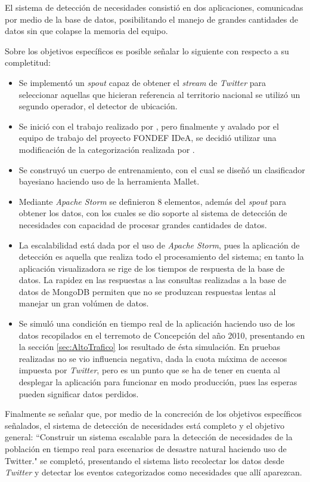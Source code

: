 El sistema de detección de necesidades consistió en dos aplicaciones, comunicadas por medio de la base de datos, posibilitando el manejo de grandes cantidades de datos sin que colapse la memoria del equipo.

Sobre los objetivos específicos es posible señalar lo siguiente con respecto a su completitud:

\begin{itemize}
\item Se implementó un \textit{spout} capaz de obtener el \textit{stream} de \textit{Twitter} para seleccionar aquellas que hicieran referencia al territorio nacional se utilizó un segundo operador, el detector de ubicación.
\item Se inició con el trabajo realizado por \cite{TaxonomiaChato}, pero finalmente y avalado por el equipo de trabajo del proyecto FONDEF IDeA, se decidió utilizar una modificación de la categorización realizada por \cite{PMIProfes}.
\item Se construyó un cuerpo de entrenamiento, con el cual se diseñó un clasificador bayesiano haciendo uso de la herramienta Mallet.
\item Mediante \textit{Apache Storm} se definieron 8 elementos, además del \textit{spout} para obtener los datos, con los cuales se dio soporte al sistema de detección de necesidades con capacidad de procesar grandes cantidades de datos.
\item La escalabilidad está dada por el uso de \textit{Apache Storm}, pues la aplicación de detección es aquella que realiza todo el procesamiento del sistema; en tanto la aplicación visualizadora se rige de los tiempos de respuesta de la base de datos. La rapidez en las respuestas a las consultas realizadas a la base de datos de MongoDB permiten que no se produzcan respuestas lentas al manejar un gran volúmen de datos.
\item Se simuló una condición en tiempo real de la aplicación haciendo uso de los datos recopilados en el terremoto de Concepción del año 2010, presentando en la sección \ref{sec:AltoTrafico} los resultado de ésta simulación. En pruebas realizadas no se vio influencia negativa, dada la cuota máxima de accesos impuesta por \textit{Twitter}, pero es un punto que se ha de tener en cuenta al desplegar la aplicación para funcionar en modo producción, pues las esperas pueden significar datos perdidos.
\end{itemize}

Finalmente se señalar que, por medio de la concreción de los objetivos específicos señalados, el sistema de detección de necesidades está completo y el objetivo general: ``Construir un sistema escalable para la detección de necesidades de la población en tiempo real para escenarios de desastre natural haciendo uso de Twitter." se completó, presentando el sistema listo recolectar los datos desde \textit{Twitter} y detectar los eventos categorizados como necesidades que allí aparezcan.

